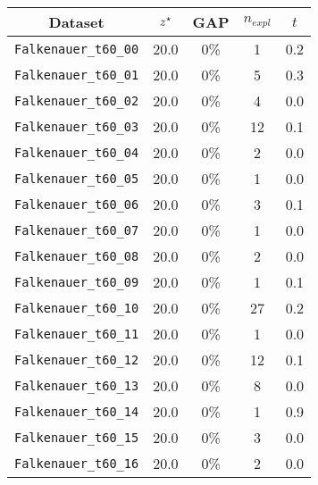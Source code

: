 \begin{figure}[!ht]
	\centering
	\scriptsize{
	\begin{minipage}{0.47\linewidth}
		\centering
		\begin{tabular}{|ccccc|}
			\hline
			\rowcolor{gray!50}
			Dataset                      & ${z}^{\star}$ & GAP & $n_{expl}$ & $t$ \\
			\hline
			\texttt{Falkenauer\_t60\_00} & 20.0           & 0\% & 1               & 0.2       \\
			\texttt{Falkenauer\_t60\_01} & 20.0           & 0\% & 5               & 0.3       \\
			\texttt{Falkenauer\_t60\_02} & 20.0           & 0\% & 4               & 0.0         \\
			\texttt{Falkenauer\_t60\_03} & 20.0           & 0\% & 12              & 0.1       \\
			\texttt{Falkenauer\_t60\_04} & 20.0           & 0\% & 2               & 0.0         \\
			\texttt{Falkenauer\_t60\_05} & 20.0           & 0\% & 1               & 0.0         \\
			\texttt{Falkenauer\_t60\_06} & 20.0           & 0\% & 3               & 0.1       \\
			\texttt{Falkenauer\_t60\_07} & 20.0           & 0\% & 1               & 0.0         \\
			\texttt{Falkenauer\_t60\_08} & 20.0           & 0\% & 2               & 0.0         \\
			\texttt{Falkenauer\_t60\_09} & 20.0           & 0\% & 1               & 0.1       \\
			\texttt{Falkenauer\_t60\_10} & 20.0           & 0\% & 27              & 0.2       \\
			\texttt{Falkenauer\_t60\_11} & 20.0           & 0\% & 1               & 0.0         \\
			\texttt{Falkenauer\_t60\_12}& 20.0           & 0\% & 12              & 0.1       \\
			\texttt{Falkenauer\_t60\_13} & 20.0           & 0\% & 8               & 0.0         \\
			\texttt{Falkenauer\_t60\_14} & 20.0           & 0\% & 1               & 0.9      \\
			\texttt{Falkenauer\_t60\_15} & 20.0           & 0\% & 3               & 0.0         \\
			\texttt{Falkenauer\_t60\_16} & 20.0           & 0\% & 2               & 0.0         \\

\end{tabular}
\end{minipage}}
\end{figure}
